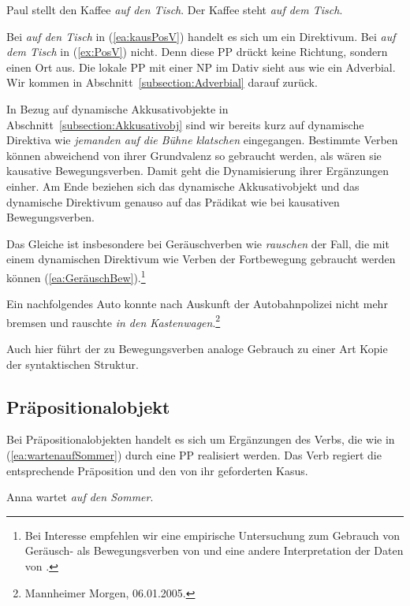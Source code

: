 \ea \label{ea:kaus_Pos_V}
\ea\label{ea:kausPosV} Paul stellt den Kaffee \textit{auf den Tisch}.
\ex \label{ex:PosV} Der Kaffee steht \textit{auf dem Tisch}.
\z 
\z 

Bei \textit{auf den Tisch} in (\ref{ea:kausPosV}) handelt es sich um ein Direktivum. Bei \textit{auf dem Tisch} in (\ref{ex:PosV}) nicht. Denn diese PP drückt keine Richtung, sondern einen Ort aus. Die lokale PP mit einer NP im Dativ sieht aus wie ein Adverbial. Wir kommen in Abschnitt~\ref{subsection:Adverbial} darauf zurück.

In Bezug auf dynamische Akkusativobjekte in Abschnitt~\ref{subsection:Akkusativobj} sind wir bereits kurz auf dynamische Direktiva wie \textit{jemanden auf die Bühne klatschen} eingegangen. Bestimmte Verben können abweichend von ihrer Grundvalenz so gebraucht werden, als wären sie kausative Bewegungsverben. Damit geht die Dynamisierung ihrer Ergänzungen einher. Am Ende beziehen sich das dynamische Akkusativobjekt und das dynamische Direktivum genauso auf das Prädikat wie bei kausativen Bewegungsverben. 

Das Gleiche ist insbesondere bei Geräuschverben wie \textit{rauschen} der Fall, die mit einem dynamischen Direktivum wie Verben der Fortbewegung gebraucht werden können (\ref{ea:GeräuschBew}).\footnote{Bei Interesse empfehlen wir eine empirische Untersuchung zum Gebrauch von Geräusch- als Bewegungsverben von \citet{Engelberg2009} und eine andere Interpretation der Daten von \citet[239--243]{Welke2019}.}

\ea \label{ea:GeräuschBew} Ein nachfolgendes Auto konnte nach Auskunft der Autobahnpolizei nicht mehr bremsen und rauschte \textit{in den Kastenwagen}.\footnote{Mannheimer Morgen, 06.01.2005.} 
\z 

Auch hier führt der zu Bewegungsverben analoge Gebrauch zu einer Art Kopie der syntaktischen Struktur.


\subsection{Präpositionalobjekt}\label{subsection:Pobj}

Bei Präpositionalobjekten handelt es sich um Ergänzungen des Verbs, die wie in (\ref{ea:wartenaufSommer}) durch eine PP realisiert werden. Das Verb regiert die entsprechende Präposition und den von ihr geforderten Kasus.

\ea \label{ea:wartenaufSommer} Anna wartet \textit{auf den Sommer}.
\z 

